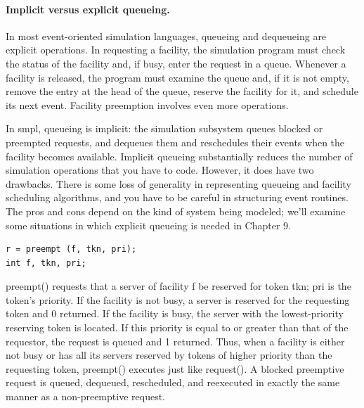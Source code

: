 \paragraph{Implicit versus explicit queueing.}
In most event-oriented simulation languages, queueing and dequeueing are
explicit operations. In requesting a facility, the simulation program must
check the status of the facility and, if busy, enter the request in a queue.
Whenever a facility is released, the program must examine the queue and, if it
is not empty, remove the entry at the head of the queue, reserve the facility
for it, and schedule its next event. Facility preemption involves even more
operations.

In smpl, queueing is implicit: the simulation subsystem queues blocked or
preempted requests, and dequeues them and reschedules their events when the
facility becomes available. Implicit queueing substantially reduces the
number of simulation operations that you have to code. However, it does have
two drawbacks. There is some loss of generality in representing queueing and
facility scheduling algorithms, and you have to be careful in structuring
event routines. The pros and cons depend on the kind of system being modeled;
we'll examine some situations in which explicit queueing is needed in
Chapter 9.

\begin{verbatim}
r = preempt (f, tkn, pri);
int f, tkn, pri;
\end{verbatim}

preempt() requests that a server of facility f be reserved for token tkn; pri
is the token's priority. If the facility is not busy, a server is reserved for
the requesting token and 0 returned. If the facility is busy, the server with
the lowest-priority reserving token is located. If this priority is equal to or
greater than that of the requestor, the request is queued and 1 returned.
Thus, when a facility is either not busy or has all its servers reserved by
tokens of higher priority than the requesting token, preempt() executes just
like request(). A blocked preemptive request is queued, dequeued, rescheduled,
and reexecuted in exactly the same manner as a non-preemptive request.

